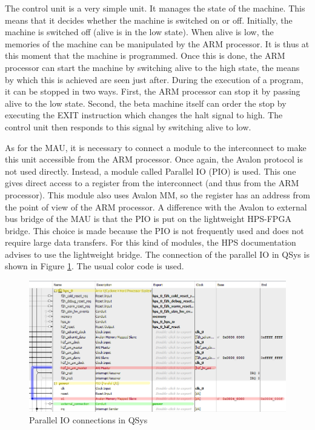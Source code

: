The control unit is a very simple unit. It manages the state of the machine. This means that 
it decides whether the machine is switched on or off. Initially, the machine is switched off (alive 
is in the low state). When alive is low, the memories of the machine can be manipulated by the ARM 
processor. It is thus at this moment that the machine is programmed. Once this is done, the ARM 
processor can start the machine by switching alive to the high state, the means by which this is 
achieved are seen just after. During the execution of a program, it can be stopped in two ways. 
First, the ARM processor can stop it by passing alive to the low state. Second, 
the beta machine itself can order the stop by executing the EXIT instruction which changes the 
halt signal to high. The control unit then responds to this signal by switching alive to low.

As for the MAU, it is necessary to connect a module to the interconnect to make this unit 
accessible from the ARM processor. Once again, the Avalon protocol is not used directly. 
Instead, a module called Parallel IO (PIO) is used. This one gives direct access to a register 
from the interconnect (and thus from the ARM processor). This module also uses Avalon MM, so 
the register has an address from the point of view of the ARM processor. A difference with 
the Avalon to external bus bridge of the MAU is that the PIO is put on the lightweight HPS-FPGA 
bridge. This choice is made because the PIO is not frequently used and does not require large data 
transfers. For this kind of modules, the HPS documentation advises to use the lightweight bridge.
The connection of the parallel IO in QSys is shown in Figure \ref{fig:qsys/ctrlu}. The usual color code is used.

\begin{figure}[ht!]
    \center
    \includegraphics[width=\linewidth]{"Chapter5-MAU_CTRLU/res/qsys_ctrlu.PNG"}
    \caption{Parallel IO connections in QSys}
    \label{fig:qsys/ctrlu}
\end{figure}

